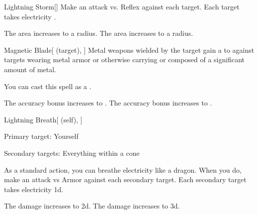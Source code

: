 \lowercase{\hypertarget{spell:Lightning Storm}{}}\label{spell:Lightning Storm}
\begin{freeability}[Rank 3]{\hypertarget{spell:Lightning Storm}{Lightning Storm}}[]
Make an attack vs. Reflex against each target.
\hit Each target takes electricity .

\rankline
{} The area increases to a \arealarge radius.
 The area increases to a \areahuge radius.
\end{freeability}
\vspace{0.25em}



\lowercase{\hypertarget{spell:Magnetic Blade}{}}\label{spell:Magnetic Blade}
\begin{attuneability}[Rank 3]{\hypertarget{spell:Magnetic Blade}{Magnetic Blade}}[ (target), ]
Metal weapons wielded by the target gain a   to  against targets wearing metal armor or otherwise carrying or composed of a significant amount of metal.

You can cast this spell as a .

\rankline
{} The accuracy bonus increases to .
 The accuracy bonus increases to .
\end{attuneability}
\vspace{0.25em}



\lowercase{\hypertarget{spell:Lightning Breath}{}}\label{spell:Lightning Breath}
\begin{attuneability}[Rank 4]{\hypertarget{spell:Lightning Breath}{Lightning Breath}}[ (self), ]

Primary target: Yourself
\par\noindent
Secondary targets: Everything within a \arealarge cone

As a standard action, you can breathe electricity like a dragon.
When you do, make an attack vs Armor against each secondary target.
\hit Each secondary target takes electricity  \plus1d.

\rankline
{} The damage increases to  \plus2d.
 The damage increases to  \plus3d.
\end{attuneability}
\vspace{0.25em}




